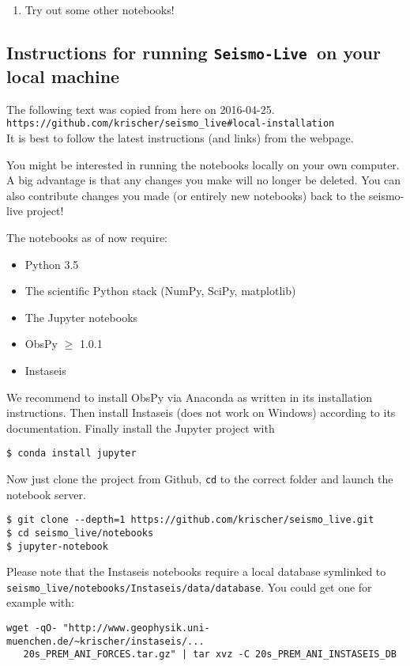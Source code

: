 \documentclass[11pt,titlepage,fleqn]{article}
\newcommand{\slive}{{\tt Seismo-Live}}
\begin{document}
\begin{enumerate}
\item Try out some other notebooks!

\end{enumerate}


\subsection*{Instructions for running \slive\ on your local machine}

The following text was copied from here on 2016-04-25. \\
\verb+https://github.com/krischer/seismo_live#local-installation+ \\
It is best to follow the latest instructions (and links) from the webpage.

\bigskip\noindent
You might be interested in running the notebooks locally on your own computer. A big advantage is that any changes you make will no longer be deleted. You can also contribute changes you made (or entirely new notebooks) back to the seismo-live project!

The notebooks as of now require:
%
\begin{itemize}
\item Python 3.5
\item The scientific Python stack (NumPy, SciPy, matplotlib)
\item The Jupyter notebooks
\item ObsPy $\ge$ 1.0.1
\item Instaseis
\end{itemize}
%
We recommend to install ObsPy via Anaconda as written in its installation instructions. Then install Instaseis (does not work on Windows) according to its documentation. Finally install the Jupyter project with
%
\begin{verbatim}
$ conda install jupyter
\end{verbatim}
%
Now just clone the project from Github, \verb+cd+ to the correct folder and launch the notebook server.
%
\begin{verbatim}
$ git clone --depth=1 https://github.com/krischer/seismo_live.git
$ cd seismo_live/notebooks
$ jupyter-notebook
\end{verbatim}
%
Please note that the Instaseis notebooks require a local database symlinked to \verb+seismo_live/notebooks/Instaseis/data/database+. You could get one for example with:
%
\begin{verbatim}
wget -qO- "http://www.geophysik.uni-muenchen.de/~krischer/instaseis/...
   20s_PREM_ANI_FORCES.tar.gz" | tar xvz -C 20s_PREM_ANI_INSTASEIS_DB
\end{verbatim}
\end{document}
